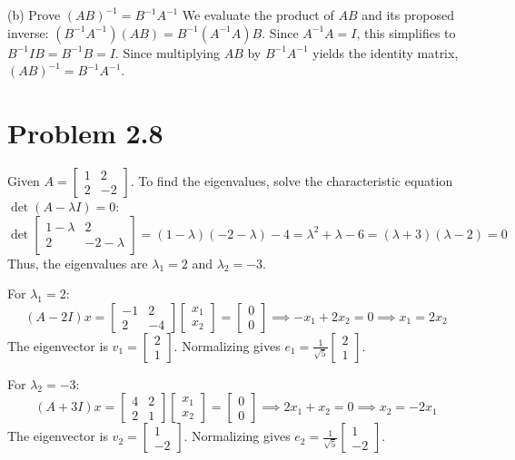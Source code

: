 \documentclass[12pt]{article}
\begin{document}
{(b) Prove $(AB)^{-1} = B^{-1}A^{-1}$} 
We evaluate the product of $AB$ and its proposed inverse: $(B^{-1}A^{-1})(AB) = B^{-1}(A^{-1}A)B$. 
Since $A^{-1}A = I$, this simplifies to $B^{-1}IB = B^{-1}B = I$. 
Since multiplying $AB$ by $B^{-1}A^{-1}$ yields the identity matrix, $(AB)^{-1} = B^{-1}A^{-1}$. \\

\section*{Problem 2.8} 
Given $A = \begin{bmatrix} 1 & 2 \\ 2 & -2 \end{bmatrix}$. 
To find the eigenvalues, solve the characteristic equation $\det(A - \lambda I) = 0$: 
\[
\det \begin{bmatrix} 1-\lambda & 2 \\ 2 & -2-\lambda \end{bmatrix} = (1-\lambda)(-2-\lambda) - 4 = \lambda^2 + \lambda - 6 = (\lambda+3)(\lambda-2) = 0
\]
Thus, the eigenvalues are $\lambda_1 = 2$ and $\lambda_2 = -3$. 

For $\lambda_1 = 2$:
\[
(A - 2I)x = \begin{bmatrix} -1 & 2 \\ 2 & -4 \end{bmatrix} \begin{bmatrix} x_1 \\ x_2 \end{bmatrix} = \begin{bmatrix} 0 \\ 0 \end{bmatrix} \implies -x_1 + 2x_2 = 0 \implies x_1 = 2x_2
\]
The eigenvector is $v_1 = \begin{bmatrix} 2 \\ 1 \end{bmatrix}$. Normalizing gives $e_1 = \frac{1}{\sqrt{5}} \begin{bmatrix} 2 \\ 1 \end{bmatrix}$. 

For $\lambda_2 = -3$:
\[
(A + 3I)x = \begin{bmatrix} 4 & 2 \\ 2 & 1 \end{bmatrix} \begin{bmatrix} x_1 \\ x_2 \end{bmatrix} = \begin{bmatrix} 0 \\ 0 \end{bmatrix} \implies 2x_1 + x_2 = 0 \implies x_2 = -2x_1
\]
The eigenvector is $v_2 = \begin{bmatrix} 1 \\ -2 \end{bmatrix}$. Normalizing gives $e_2 = \frac{1}{\sqrt{5}} \begin{bmatrix} 1 \\ -2 \end{bmatrix}$. 
\end{document}
